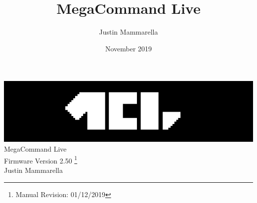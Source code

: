 \documentclass[openany,a4paper,12pt]{book}
\begin{document}
\author{Justin Mammarella}
\title{MegaCommand Live}
\date{November 2019}

\frontmatter
\begin{titlepage}

	\begin{center}
	\vspace*{5.75cm}
	\includegraphics{mcl_logo_black_short.png}
    \vspace*{1.00cm}
	\LARGE
	\vspace*{0.65cm}
	\\MegaCommand Live
    \large
	\\Firmware Version 2.50
	\footnote{Manual Revision: 01/12/2019}
    \vspace*{2cm}
    \\Justin Mammarella
\end{center}
\end{titlepage}


\tableofcontents

\mainmatter
































\backmatter

\end{document}
